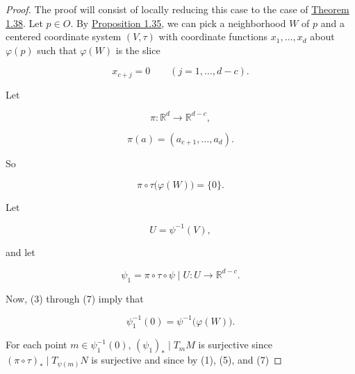 \begin{proof}
	The proof will consist of locally reducing this case to the case of \hyperref[thm:1.38]{Theorem 1.38}. Let $p \in O$. By \hyperref[thm:1.35]{Proposition 1.35}, we can pick a neighborhood $W$ of $p$ and a centered coordinate system $(V, \tau)$ with coordinate functions $x_{1}, \ldots, x_{d}$ about $\varphi(p)$ such that $\varphi(W)$ is the slice



	\begin{equation}
		\tag{3}\label{eq:1.39:3}
		x_{c+j}=0\qquad(j=1,\ldots,d-c).
	\end{equation}

	Let

	\[
		\pi\colon\mathbb{R}^{d}\to\mathbb{R}^{d-c},
	\]

	\begin{equation}
		\tag{4}\label{eq:1.39:4}
		\pi(a)=(a_{c+1},\ldots,a_{d}).
	\end{equation}

	So



	\begin{equation}
		\tag{5}\label{eq:1.39:5}
		\pi\circ\tau\bigl(\varphi(W)\bigr)=\{0\}.
	\end{equation}

	Let



	\begin{equation}
		\tag{6}\label{eq:1.39:6}
		U=\psi^{-1}(V),
	\end{equation}

	and let



	\begin{equation}
		\tag{7}\label{eq:1.39:7}
		\psi_{1}=\pi\circ\tau\circ\psi\mid U\colon U\to\mathbb{R}^{d-c}.
	\end{equation}

	\begin{center}
	\end{center}

	Now, (3) through (7) imply that

	\begin{equation}
		\tag{8}\label{eq:1.39:8}
		\psi_{1}^{-1}(0)=\psi^{-1}\big(\varphi(W)\big).
	\end{equation}

	For each point  $ m \in \psi_{1}^{-1}(0) $,  $ (\psi_{1})_{*} \mid T_{m} M $ is surjective since  $ (\pi \circ \tau)_{*} \mid T_{\psi(m)} N $ is surjective and since by (1), (5), and (7)


\end{proof}
